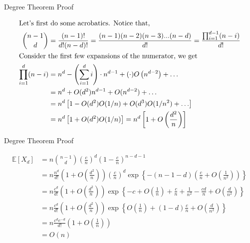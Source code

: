 \begin{frame}{Degree Theorem Proof}
    \begin{proofs}
        \setlength{\abovedisplayskip}{2pt}
        \setlength{\belowdisplayskip}{0pt}
        \setlength{\abovedisplayshortskip}{2pt}
        \setlength{\belowdisplayshortskip}{0pt}
        \begin{align*}
            \intertext{Let's first do some acrobatics. Notice that,}
            {{n - 1} \choose d} &= \frac{(n - 1)!}{d!(n - d)!} = \frac{(n - 1)(n - 2)(n - 3)...(n - d) }{d!} = \frac{\prod_{i = 1}^{d - 1}(n - i) }{d!}\\
            \intertext{Consider the first few expansions of the numerator, we get}
            \prod_{i = 1}^{d}(n - i) &= n^{d} - \left(\sum_{ i = 1}^{d} i\right) \cdot n^{d - 1} + (\cdot)O\left(n^{d - 2}\right) + \hdots\\ 
            &= n^{d} + O(d^2)n^{d - 1} + O(n^{d - 2}) + \hdots\\
            &= n^{d}\left[1 - O(d^2)O(1/n) + O(d^3)O(1/n^2) + \hdots\right]\\
            &= n^{d}\left[1 + O(d^2)O(1/n)\right] = n^d\left[1 + O\left(\frac{d^2}{n}\right)\right]
        \end{align*}
    \end{proofs}
\end{frame}

\begin{frame}{Degree Theorem Proof}
    \begin{proofs}
        \setlength{\abovedisplayskip}{2pt}
        \setlength{\belowdisplayskip}{0pt}
        \setlength{\abovedisplayshortskip}{2pt}
        \setlength{\belowdisplayshortskip}{0pt}
        \begin{align*}
            \mathbb{E}[X_d] &= n{{n - 1} \choose d}\left(\frac{c}{n}\right)^d \left(1 - \frac{c}{n}\right)^{n - d - 1}\\
            &= n \frac{n^d}{d!}\left(1 + O\left(\frac{d^2}{n}\right)\right)\left(\frac{c}{n}\right)^d \exp\left\{-(n - 1 - d)\left(\frac{c}{n} + O\left(\frac{1}{n^2}\right)\right)\right\}\\
            &= n\frac{c^d}{d!}\left(1 + O\left(\frac{d^2}{n}\right)\right)\exp\left\{-c + O\left(\frac{1}{n}\right) + \frac{c}{n} + \frac{1}{n^2}-\frac{cd}{n} + O\left(\frac{d}{n^2}\right)\right\}\\
            &= n\frac{c^d}{d!}\left(1 + O\left(\frac{d^2}{n}\right)\right)\exp\left\{O\left(\frac{1}{n}\right) + (1 - d)\frac{c}{n} + O\left(\frac{d}{n^2}\right)\right\}\\
            &= n\frac{c^de^{-d}}{d!}\left(1 + O\left(\frac{1}{n}\right)\right)\\
            &= O(n)\\
        \end{align*}
    \end{proofs}
\end{frame}


